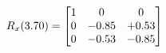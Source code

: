 \documentclass[preview]{standalone}
\begin{document}
\begin{align*}
\special{dvisvgm:raw <g id='unique000'>}R_{x}(3.70) = \begin{bmatrix}1 & 0 & 0 \\0 & -0.85 & +0.53 \\0 & -0.53 & -0.85\end{bmatrix}\special{dvisvgm:raw </g>}
\end{align*}
\end{document}
